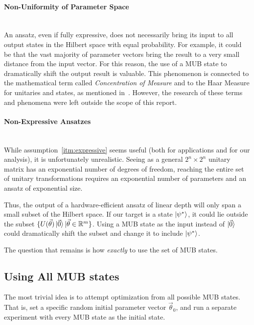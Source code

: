 \documentclass[a4paper,12pt]{article}
\newcommand{\thetas}{\vec{\theta}}
\begin{document}
\paragraph*{Non-Uniformity of Parameter Space}~\\
An ansatz, even if fully expressive, does not necessarily bring its input to all output states in the Hilbert space with equal probability. For example, it could be that the vast majority of parameter vectors bring the result to a very small distance from the input vector.
For this reason, the use of a MUB state to dramatically shift the output result is valuable.
This phenomenon is connected to the mathematical term called \emph{Concentration of Measure} and to the Haar Measure for unitaries and states, as mentioned in~\cite{mcclean_barren_2018}.
However, the research of these terms and phenomena were left outside the scope of this report.

\paragraph*{Non-Expressive Ansatzes}~\\
While assumption~\ref{itm:expressive} seems useful (both for applications and for our analysis), it is unfortunately unrealistic.
Seeing as a general $2^n \times 2^n$ unitary matrix has an exponential number of degrees of freedom, reaching the entire set of unitary transformations requires an exponential number of parameters and an ansatz of exponential size.

Thus, the output of a hardware-efficient ansatz of linear depth will only span a small subset of the Hilbert space.
If our target is a state $\ket{\psi^*}$, it could lie outside the subset $\{U(\thetas)\ket{\vec{0}} | \thetas \in \mathbb{R}^m\}$. Using a MUB state as the input instead of $\ket{\vec{0}}$ could dramatically shift the subset and change it to include $\ket{\psi^*}$.

\medskip
The question that remains is how \emph{exactly} to use the set of MUB states.

\subsection{Using All MUB states} \label{meth:all_mub}
The most trivial idea is to attempt optimization from all possible MUB states.
That is, set a specific random initial parameter vector $\thetas_0$, and run a separate experiment with every MUB state as the initial state.
\end{document}
